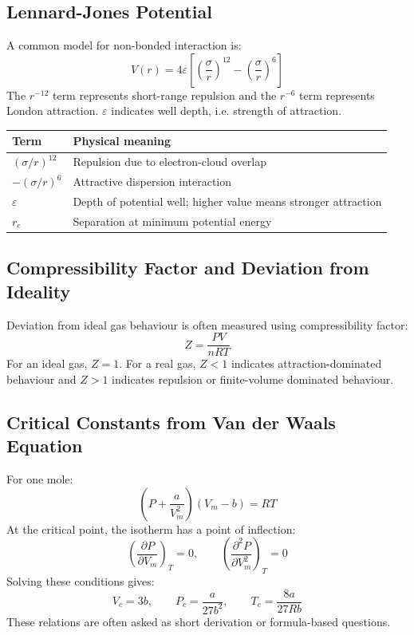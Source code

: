 \documentclass[12pt,a4paper]{article}
\begin{document}
\subsection{Lennard-Jones Potential}
A common model for non-bonded interaction is:
\[
V(r)=4\varepsilon\left[\left(\frac{\sigma}{r}\right)^{12}-\left(\frac{\sigma}{r}\right)^6\right]
\]
The $r^{-12}$ term represents short-range repulsion and the $r^{-6}$ term represents London attraction. $\varepsilon$ indicates well depth, i.e. strength of attraction.

\begin{tabularx}{\linewidth}{|B{3cm}|Y|}
\hline
\textbf{Term} & \textbf{Physical meaning} \\
\hline
$\left(\sigma/r\right)^{12}$ & Repulsion due to electron-cloud overlap \\
\hline
$-\left(\sigma/r\right)^6$ & Attractive dispersion interaction \\
\hline
$\varepsilon$ & Depth of potential well; higher value means stronger attraction \\
\hline
$r_e$ & Separation at minimum potential energy \\
\hline
\end{tabularx}

\subsection{Compressibility Factor and Deviation from Ideality}
Deviation from ideal gas behaviour is often measured using compressibility factor:
\[
Z=\frac{PV}{nRT}
\]
For an ideal gas, $Z=1$. For a real gas, $Z<1$ indicates attraction-dominated behaviour and $Z>1$ indicates repulsion or finite-volume dominated behaviour.

\begin{tcolorbox}[tikzbox, title={Compressibility Factor: Qualitative Behaviour}]
\centering
{}
\end{tcolorbox}

\subsection{Critical Constants from Van der Waals Equation}
For one mole:
\[
\left(P+\frac{a}{V_m^2}\right)(V_m-b)=RT
\]
At the critical point, the isotherm has a point of inflection:
\[
\left(\frac{\partial P}{\partial V_m}\right)_T=0,\qquad
\left(\frac{\partial^2 P}{\partial V_m^2}\right)_T=0
\]
Solving these conditions gives:
\[
V_c=3b,\qquad P_c=\frac{a}{27b^2},\qquad T_c=\frac{8a}{27Rb}
\]
These relations are often asked as short derivation or formula-based questions.
\end{document}

